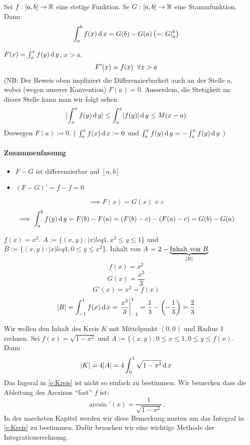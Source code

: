\begin{Kor}
  Sei $f:[a,b]\to\mathbb{R}$ eine stetige Funktion. Se $G:[a,b]\to\mathbb{R}$ eine Stammfunktion. Dann:
  \[\int_a^bf(x)\operatorname{d} x=G(b)-G(a)\left( =:G|_a^b \right)\]
\end{Kor}
\begin{Bew} $F(x)=\int_a^xf(y)\operatorname{d} y$, $x>a$. 
\[F'(x)=f(x)\hspace{2mm}\forall x>a\]
(NB: Der Beweis oben impliziert die Differenzierbarkeit auch an der Stelle $a$, 
wobei (wegen unserer Konvention) $F(a)=0$. Ausserdem, die Stetigkeit an dieser Stelle
kann man wir folgt sehen  
  \[\mathopen| \int_a^xf(y)\operatorname{d} y \mathclose|\leq \int_a^x\mathopen| f(y) \mathclose|\operatorname{d} y\leq M(x-a)\]
  Deswegen $F(a):=0$. ( $\int_a^af(x)\operatorname{d} x:= 0$ und $\int_a^xf(y)\operatorname{d} y=-\int_x^af(y)\operatorname{d} y$ )
\paragraph{Zusammenfassung}
\begin{itemize}
  \item $F-G$ ist differenzierbar auf $[a,b]$
  \item $(F-G)'=f-f=0$
\end{itemize}
\[\implies F(x)=G(x)+c\]
\[\implies \int_a^bf(y)\operatorname{d} y=F(b)-F(a)=(F(b)-c)-(F(a)-c)=G(b)-G(a)\]
\end{Bew}
\begin{Bsp}
  $f(x)=x^2$. $A:= \{(x,y): |x|leq 1, x^2\leq y\leq 1\}$ 
und $B:= \{(x,y): |x|leq 1, 0\leq y \leq x^2\}$.
  Inhalt von $A$ = $2-\underbrace{\text{Inhalt von }B}_{ \mathopen|  B  \mathclose| }$
  \[f(x)=x^2\]
  \[G(x)=\frac{x^3}{3}\]
  \[G'(x)=x^2=f(x)\]
  \[\mathopen| B \mathclose|=\int_{-1}^1f(x)\operatorname{d} x=\left.\frac{x^3}{3}\right|_{-1}^1=\frac{1}{3}-\left( -\frac{1}{3} \right)=\frac{2}{3}\]
\end{Bsp}
\begin{Bsp}\label{b:Kreis} Wir wollen den Inhalt des Kreis $K$ mit Mittelpunkt $(0,0)$ und Radius 1 
rechnen. Sei $f(x)=\sqrt{1-x^2}$ und $A:= \{(x,y): 0\leq x\leq 1, 0\leq y\leq f(x)$. Dann
\begin{equation}\label{e:Kreis}
|K| = 4 |A|= 4 \int_0^1\sqrt{1-x^2}\operatorname{d} x
 \end{equation}
Das Ingeral in \eqref{e:Kreis} ist nicht so einfach zu bestimmen. Wir bemerken
dass die Ableitung des Arcsinus ``fast'' $f$ ist: 
  \[\arcsin'(x)=\frac{1}{\sqrt{1-x^2}}\, .\]
In der naechsten Kapitel werden wir diese Bemerkung nuzten um das Integral
in \eqref{e:Kreis} zu bestimmen. Daf\"ur brauchen wir eine wichtige Methode
der Integrationsrechnung.
\end{Bsp}
